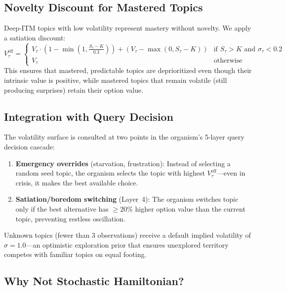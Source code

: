 \documentclass[11pt,a4paper,twocolumn]{article}
\begin{document}
\subsection{Novelty Discount for Mastered Topics}

Deep-ITM topics with low volatility represent mastery without novelty.
We apply a satiation discount:
\begin{equation}
V_\tau^{\mathrm{eff}} = \begin{cases}
V_\tau \cdot \left(1 - \min\!\left(1, \frac{S_\tau - K}{0.3}\right)\right) + (V_\tau - \max(0, S_\tau - K)) & \text{if } S_\tau > K \text{ and } \sigma_\tau < 0.2 \\
V_\tau & \text{otherwise}
\end{cases}
\label{eq:bs_novelty}
\end{equation}
This ensures that mastered, predictable topics are deprioritized even though their intrinsic value is positive, while mastered topics that remain volatile (still producing surprises) retain their option value.

\subsection{Integration with Query Decision}

The volatility surface is consulted at two points in the organism's 5-layer query decision cascade:
\begin{enumerate}
\item \textbf{Emergency overrides} (starvation, frustration): Instead of selecting a random seed topic, the organism selects the topic with highest $V_\tau^{\mathrm{eff}}$---even in crisis, it makes the best available choice.
\item \textbf{Satiation/boredom switching} (Layer~4): The organism switches topic only if the best alternative has $\geq 20\%$ higher option value than the current topic, preventing restless oscillation.
\end{enumerate}

Unknown topics (fewer than 3 observations) receive a default implied volatility of $\sigma = 1.0$---an optimistic exploration prior that ensures unexplored territory competes with familiar topics on equal footing.

\subsection{Why Not Stochastic Hamiltonian?}
\end{document}
